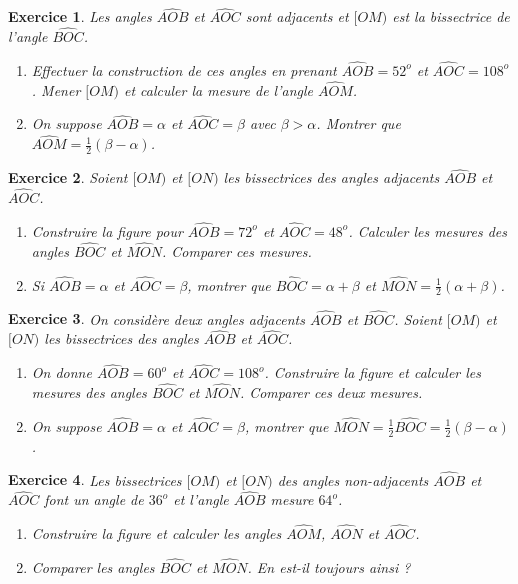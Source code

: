 \documentclass[12 pt]{article}
\theoremstyle{plain}
\newcounter{n}
\numberwithin{n}{section}
\newtheorem{exo}{Exercice}
\begin{document}
\begin{exo}Les angles $\widehat{AOB}$ et $\widehat{AOC}$ sont adjacents et 
$[OM)$ est la bissectrice de l'angle $\widehat{BOC}$. 
\begin{enumerate}
\item Effectuer la construction de ces angles en prenant $\widehat{AOB}= 52^o$ et $\widehat{AOC}=108^o$. Mener $[OM)$ et calculer la mesure 
de l'angle $\widehat{AOM}$. 
\item On suppose $\widehat{AOB}= \alpha$ et $\widehat{AOC}= \beta$ avec $\beta>\alpha$. Montrer que $\widehat{AOM}= \frac12(\beta-\alpha)$. 
\end{enumerate}
\end{exo}
\begin{exo}
Soient $[OM)$ et $[ON)$ les bissectrices des angles adjacents $\widehat{AOB}$ et $\widehat{AOC}$. 
\begin{enumerate}
\item Construire la figure pour $\widehat{AOB}= 72^o$ et $\widehat{AOC}= 48^o$. Calculer les mesures des angles $\widehat{BOC}$ et $\widehat{MON}$. Comparer ces mesures. 
\item Si $\widehat{AOB}= \alpha$ et $\widehat{AOC}= \beta$, montrer 
que $\widehat{BOC}= \alpha + \beta$ et $\widehat{MON}= \frac12(\alpha+\beta)$. 
\end{enumerate}
\end{exo}

\begin{exo}On considère deux angles adjacents $\widehat{AOB}$ et $\widehat{BOC}$. Soient $[OM)$ et $[ON)$ les bissectrices des angles $\widehat{AOB}$ et $\widehat{AOC}$.
\begin{enumerate}
\item On donne $\widehat{AOB}= 60^o$ et $\widehat{AOC}= 108^o$. Construire la figure et calculer les mesures des angles $\widehat{BOC}$ et $\widehat{MON}$. Comparer ces deux mesures. 
\item On suppose $\widehat{AOB}= \alpha$ et $\widehat{AOC}= \beta$, montrer que $\widehat{MON}= \frac12\widehat{BOC}= \frac12(\beta-\alpha)$. 
\end{enumerate}\end{exo}

\begin{exo} Les bissectrices $[OM)$ et $[ON)$ des angles non-adjacents $\widehat{AOB}$ et $\widehat{AOC}$ font un angle de $36^o$ et l'angle $\widehat{AOB}$ mesure $64^o$. \begin{enumerate}
\item Construire la figure et calculer les angles $\widehat{AOM}$, $\widehat{AON}$ et $\widehat{AOC}$.
\item Comparer les angles $\widehat{BOC}$ et $\widehat{MON}$. En est-il toujours ainsi ? 
\end{enumerate}
\end{exo}
\end{document}
